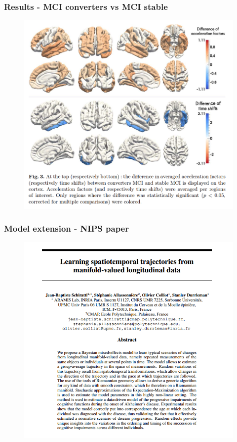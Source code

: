 \documentclass[10pt,xcolor=table]{beamer}
\begin{document}
\begin{frame}
\frametitle{Results - MCI converters vs MCI stable}

\begin{figure}
\includegraphics[scale=0.27]{res_fig3.png}
\end{figure}

\end{frame}

\begin{frame}
\frametitle{Model extension - NIPS paper}

\begin{figure}
\includegraphics[scale=0.5]{nips_cover.png}
\end{figure}

\end{frame}
\end{document}
